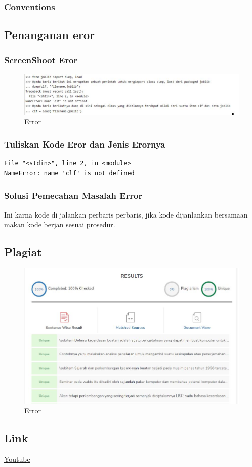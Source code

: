 \subsubsection{Conventions}



\subsection{Penanganan eror}
\subsubsection{ScreenShoot Eror}
\begin{figure}[ht]
\centering
\includegraphics[scale=0.5]{figures/1174042/chapter1/3,1.jpg}
\caption{Error}
\label{contoh}
\end{figure}

\subsubsection{Tuliskan Kode Eror dan Jenis Erornya}
\begin{verbatim}
File "<stdin>", line 2, in <module>
NameError: name 'clf' is not defined
\end{verbatim}


\subsubsection{Solusi Pemecahan Masalah Error}
Ini karna kode di jalankan perbaris perbaris, jika kode dijanlankan bersamaan makan kode berjan sesuai prosedur.

\subsection{Plagiat}
\begin{figure}[ht]
\centering
\includegraphics[scale=0.5]{figures/1174042/chapter1/5.jpg}
\caption{Error}
\label{contoh}
\end{figure}




\subsection{Link}
\href{https://youtu.be/oxm5CEsrsdY}{Youtube}